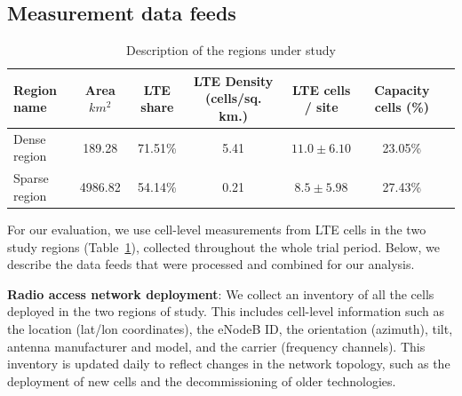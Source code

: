 \vspace{-2pt}
\subsection{Measurement data feeds}\label{data-feeds}
\vspace{-2pt}

\begin{table}[!t]
\centering
\caption{\small Description of the regions under study
\label{tab:regions}}
\begin{tabular}{lcccccc}
\toprule
\textbf{Region name} & \textbf{Area $km^2$} & \textbf{LTE share} & \textbf{LTE Density (cells/sq. km.)} & \textbf{LTE cells / site} & \textbf{Capacity cells (\%)}\\

\midrule
Dense region & 189.28 & 71.51\% & 5.41 & $11.0 \pm 6.10$ & 23.05\% \\
Sparse region & 4986.82 & 54.14\% & 0.21 & $8.5 \pm 5.98$ & 27.43\% \\
\bottomrule
\end{tabular}
\vspace{-4mm}

\end{table}

For our evaluation, we use cell-level measurements from LTE cells in the two study regions (Table~\ref{tab:regions}), collected throughout the whole trial period. Below, we describe the data feeds that were processed and combined for our analysis.

\textbf{Radio access network deployment}:
We collect an inventory of all the cells deployed in the two regions of study. This includes cell-level information such as the location (lat/lon coordinates), the eNodeB ID, the orientation (azimuth), tilt, antenna manufacturer and model, and the carrier (\ie frequency channels). This inventory is updated daily to reflect changes in the network topology, such as the deployment of new cells and the decommissioning of older technologies.

